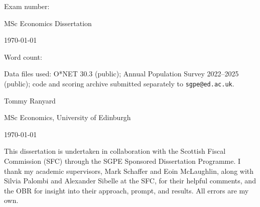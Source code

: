 


\begin{titlepage}
\centering
\vspace*{2cm}
{\LARGE\bfseries \thetitle \par}
\vspace{2cm}

\ifanonymous
  {\large Exam number: \examnumber \par}
  \vspace{0.5em}
  {\large MSc Economics Dissertation \par}
  \vspace{0.5em}
  {\large \today \par}
  \vspace{2cm}
  {\normalsize Word count: \wordcount \par}
  \vspace{1em}
  {\normalsize Data files used: O*NET 30.3 (public); Annual Population Survey 2022--2025 (public); code and scoring archive submitted separately to \texttt{sgpe@ed.ac.uk}. \par}
\else
  {\large Tommy Ranyard \par}
  \vspace{0.5em}
  {\large MSc Economics, University of Edinburgh \par}
  \vspace{0.5em}
  {\large \today \par}
  \vspace{2cm}
  \begin{minipage}{0.85\textwidth}
  \small
  This dissertation is undertaken in collaboration with the Scottish Fiscal Commission (SFC) through the SGPE Sponsored Dissertation Programme. I thank my academic supervisors, Mark Schaffer and Eoin McLaughlin, along with Silvia Palombi and Alexander Sibelle at the SFC, for their helpful comments, and the OBR for insight into their approach, prompt, and results. All errors are my own.
  \end{minipage}
\fi

\vfill
\end{titlepage}

